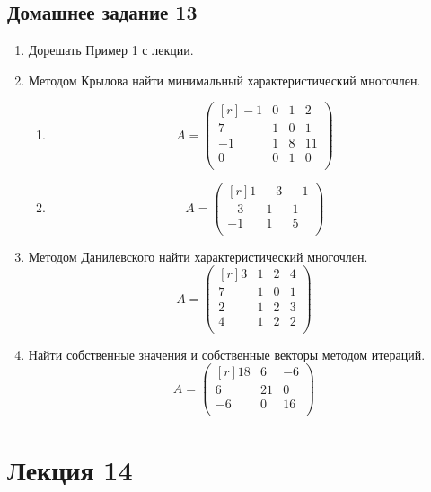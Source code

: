 \documentclass[12pt]{article}
\begin{document}
	\subsection{Домашнее задание 13}\begin{enumerate}
		\item Дорешать Пример 1 с лекции.
		\item Методом Крылова найти минимальный характеристический многочлен.
		\begin{enumerate}
			\item \[A = \begin{pmatrix}[r]
			-1 & 0 & 1 & 2\\
			7 & 1 & 0 & 1\\
			-1 & 1 & 8 & 11\\
			0 & 0 & 1 & 0\\
			\end{pmatrix}\]
			\item \[A = \begin{pmatrix}[r]
			1 & -3 & -1\\
			-3 & 1 & 1\\
			-1 & 1 & 5\\
			\end{pmatrix}\]
		\end{enumerate}
		\item Методом Данилевского найти характеристический многочлен.
		\[A = \begin{pmatrix}[r]
		3 & 1 & 2 & 4\\
		7 & 1 & 0 & 1\\
		2 & 1 & 2 & 3\\
		4 & 1 & 2 & 2\\
		\end{pmatrix}\]
		\item Найти собственные значения и собственные векторы методом итераций.
		\[A = \begin{pmatrix}[r]
		18 & 6 & -6\\
		6 & 21 & 0\\
		-6 & 0 & 16\\
		\end{pmatrix}\]
	\end{enumerate}
	
	
	\newpage
	\section{Лекция 14}
\end{document}
